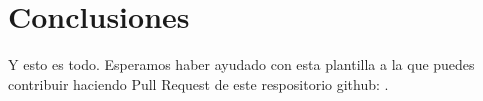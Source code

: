 \section{Conclusiones}

Y esto es todo. Esperamos haber ayudado con esta plantilla a la que puedes
contribuir haciendo Pull Request de este respositorio github: \url{}.